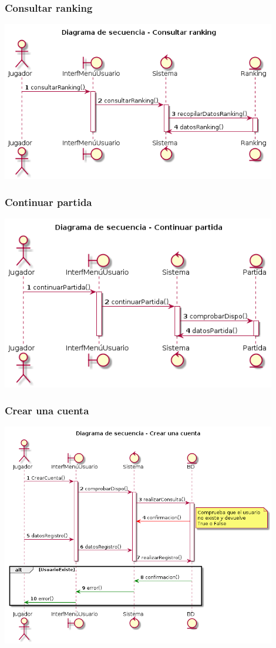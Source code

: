 \subsubsection{Consultar ranking}
  \includegraphics[width=0.9\textwidth]{./imatges/jugador/Consultar_ranking.png}
\subsubsection{Continuar partida}
  \includegraphics[width=0.9\textwidth]{./imatges/jugador/Continuar_partida.png}
\subsubsection{Crear una cuenta}
  \includegraphics[width=0.9\textwidth]{./imatges/jugador/Crear_una_cuenta.png}
